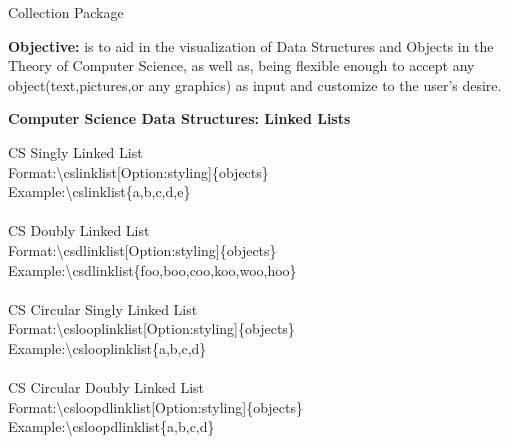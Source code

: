 \documentclass{article}
\begin{document}
\begin{center}
{\Huge Collection Package}
\end{center}
\indent \textbf{Objective:} is to aid in the visualization of Data Structures and Objects in the Theory of Computer Science, as well as, being flexible enough to accept any object(text,pictures,or any graphics) as input and customize to the user's desire.
\newpage
\begin{center}
\textbf{{\Large Computer Science Data Structures: Linked Lists}}
\end{center}

CS Singly Linked List\\
Format:{\textbackslash}cslinklist[Option:styling]{\{}objects{\}}\\
Example:{\textbackslash}cslinklist{\{}a,b,c,d,e{\}} \newline \\
\begin{adjustbox}{width=0.5\paperwidth,center,keepaspectratio}
\end{adjustbox}\\
CS Doubly Linked List\\
Format:{\textbackslash}csdlinklist[Option:styling]{\{}objects{\}}\\
Example:{\textbackslash}csdlinklist{\{}foo,boo,coo,koo,woo,hoo{\}} \newline \\
\begin{adjustbox}{width=0.5\paperwidth,center,keepaspectratio}
\end{adjustbox}\\
CS Circular Singly Linked List\\
Format:{\textbackslash}cslooplinklist[Option:styling]{\{}objects{\}}\\
Example:{\textbackslash}cslooplinklist{\{}a,b,c,d{\}} \newline \\
\begin{adjustbox}{width=0.5\paperwidth,center,keepaspectratio}
\end{adjustbox}\\
CS Circular Doubly Linked List\\
Format:{\textbackslash}csloopdlinklist[Option:styling]{\{}objects{\}}\\
Example:{\textbackslash}csloopdlinklist{\{}a,b,c,d{\}} \newline \\
\end{document}
